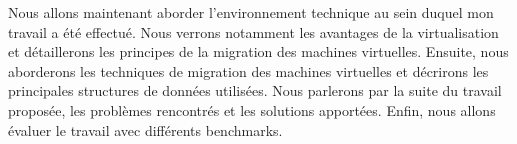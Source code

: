 Nous allons maintenant aborder l’environnement technique au sein duquel mon travail a été effectué.
Nous verrons notamment les avantages de la virtualisation et détaillerons les principes de la migration des machines virtuelles.
Ensuite, nous aborderons les techniques de migration des machines virtuelles et décrirons les principales structures de données utilisées.
Nous parlerons par la suite du travail proposée, les problèmes rencontrés et les solutions apportées.
Enfin, nous allons évaluer le travail avec différents benchmarks.